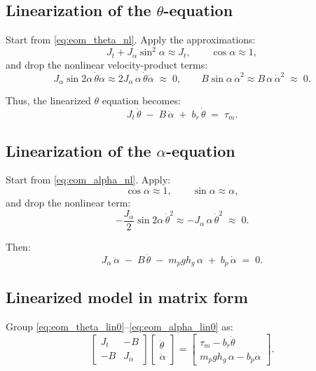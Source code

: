 \documentclass[12pt,a4paper]{article}
\begin{document}
\subsection{Linearization of the $\theta$-equation}

Start from \eqref{eq:eom_theta_nl}. Apply the approximations:
\[
J_t+J_\alpha\sin^2\alpha \approx J_t,\qquad
\cos\alpha \approx 1,
\]
and drop the nonlinear velocity-product terms:
\[
J_\alpha\sin 2\alpha\,\dot\theta\dot\alpha \approx 2J_\alpha\,\alpha\,\dot\theta\dot\alpha \;\approx\; 0,
\qquad
B\sin\alpha\,\dot\alpha^2 \approx B\,\alpha\,\dot\alpha^2 \;\approx\; 0.
\]

Thus, the linearized $\theta$ equation becomes:
\begin{equation}
\boxed{
J_t\,\ddot\theta \;-\; B\,\ddot\alpha \;+\; b_r\,\dot\theta \;=\; \tau_m.
}
\label{eq:eom_theta_lin0}
\end{equation}

\subsection{Linearization of the $\alpha$-equation}

Start from \eqref{eq:eom_alpha_nl}. Apply:
\[
\cos\alpha \approx 1,\qquad
\sin\alpha \approx \alpha,
\]
and drop the nonlinear term:
\[
-\frac{J_\alpha}{2}\sin 2\alpha\,\dot\theta^2 \approx -J_\alpha\,\alpha\,\dot\theta^2 \;\approx\; 0.
\]

Then:
\begin{equation}
\boxed{
J_\alpha\,\ddot\alpha \;-\; B\,\ddot\theta \;-\; m_p g h_g\,\alpha \;+\; b_p\,\dot\alpha \;=\; 0.
}
\label{eq:eom_alpha_lin0}
\end{equation}

\subsection{Linearized model in matrix form}

Group \eqref{eq:eom_theta_lin0}--\eqref{eq:eom_alpha_lin0} as:
\begin{equation}
\boxed{
\begin{bmatrix}
J_t & -B\\
-B & J_\alpha
\end{bmatrix}
\begin{bmatrix}
\ddot\theta\\
\ddot\alpha
\end{bmatrix}
=
\begin{bmatrix}
\tau_m - b_r\dot\theta\\
m_p g h_g\,\alpha - b_p\dot\alpha
\end{bmatrix}.
}
\label{eq:lin0_matrix_form}
\end{equation}
\end{document}
